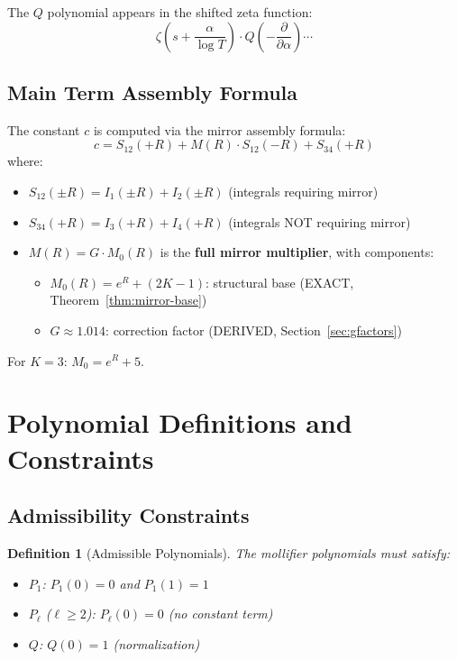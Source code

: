 \documentclass[11pt]{article}
\newtheorem{definition}{Definition}
\begin{document}
The $Q$ polynomial appears in the shifted zeta function:
\begin{equation}
\zeta\left(s + \frac{\alpha}{\log T}\right) \cdot Q\left(-\frac{\partial}{\partial \alpha}\right) \cdots
\end{equation}

\subsection{Main Term Assembly Formula}

The constant $c$ is computed via the mirror assembly formula:
\begin{equation}
\boxed{c = S_{12}(+R) + M(R) \cdot S_{12}(-R) + S_{34}(+R)}
\end{equation}
where:
\begin{itemize}
\item $S_{12}(\pm R) = I_1(\pm R) + I_2(\pm R)$ (integrals requiring mirror)
\item $S_{34}(+R) = I_3(+R) + I_4(+R)$ (integrals NOT requiring mirror)
\item $M(R) = G \cdot M_0(R)$ is the \textbf{full mirror multiplier}, with components:
  \begin{itemize}
  \item $M_0(R) = e^R + (2K-1)$: structural base (EXACT, Theorem~\ref{thm:mirror-base})
  \item $G \approx 1.014$: correction factor (DERIVED, Section~\ref{sec:gfactors})
  \end{itemize}
\end{itemize}

For $K=3$: $M_0 = e^R + 5$.

\section{Polynomial Definitions and Constraints}
\label{sec:polynomials}

\subsection{Admissibility Constraints}

\begin{definition}[Admissible Polynomials]
The mollifier polynomials must satisfy:
\begin{itemize}
\item $P_1$: $P_1(0) = 0$ and $P_1(1) = 1$
\item $P_\ell$ ($\ell \geq 2$): $P_\ell(0) = 0$ (no constant term)
\item $Q$: $Q(0) = 1$ (normalization)
\end{itemize}
\end{definition}
\end{document}
